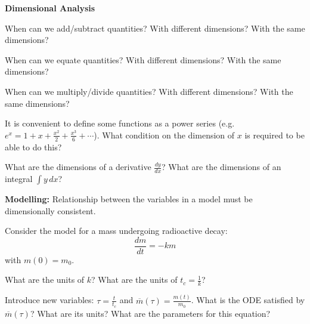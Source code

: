 \documentclass{workbook}
\begin{document}
\begin{slide}

\question 

\textbf{Dimensional Analysis}


\begin{parts}

\item When can we add/subtract quantities? With different dimensions? With the same dimensions?

\item When can we equate quantities? With different dimensions? With the same dimensions?

\item When can we multiply/divide quantities? With different dimensions? With the same dimensions?

\item It is convenient to define some functions as a power series (e.g. $e^x = 1 + x + \frac{x^2}{2} + \frac{x^3}{6}+ \cdots$). What condition on the dimension of $x$ is required to be able to do this?

\item What are the dimensions of a derivative $\frac{dy}{dx}$? What are the dimensions of an integral $\int y \, dx$?
	
\end{parts}

\begin{slidesonly}
	\bigskip
\end{slidesonly}


\textbf{Modelling:} Relationship between the variables in a model must be dimensionally consistent.

\end{slide}




\begin{slide}

\question \label{q:radioactive}

Consider the model for a mass undergoing radioactive decay:
\[ \frac{dm}{dt} = -km \]
with $m(0) = m_0$.

\begin{parts}
	\item What are the units of $k$? What are the units of $t_c=\frac{1}{k}$? %

	\item Introduce new variables: $\tau = \frac{t}{t_c}$ and $\overline{m}(\tau) = \frac{m(t)}{m_0}$. What is the ODE satisfied by $\overline{m}(\tau)$? What are its units? What are the parameters for this equation?
	
\end{parts}
	
\end{slide}
\end{document}
